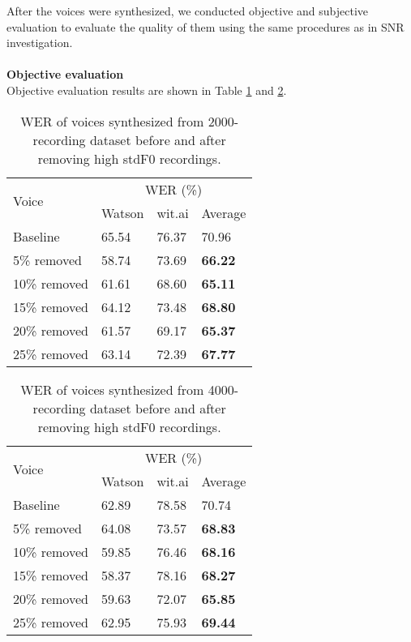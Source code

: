 \documentclass[12pt]{article}
\begin{document}
After the voices were synthesized, we conducted objective and subjective evaluation to evaluate the quality of them using the same procedures as in SNR investigation.\\\\
\textbf{Objective evaluation}
\vspace{0.28cm}\\
Objective evaluation results are shown in Table \ref{tab_werStdF02000} and \ref{tab_werStdF04000}.
\begin{table}[]
\begin{center}
\caption{WER of voices synthesized from 2000-recording dataset before and after removing high stdF0 recordings.}
\label{tab_werStdF02000}
\vspace{3mm}
\begin{tabular}{|l|l|l|l|}
\hline
\multirow{2}{2.5cm}{Voice} &
\multicolumn{3}{c|}{WER (\%)} \\ \cline{2-4}
& Watson & wit.ai & Average \\
\hline
Baseline     & 65.54 & 76.37 & 70.96 \\
5\% removed  & 58.74 & 73.69 & \textbf{66.22} \\
10\% removed & 61.61 & 68.60 & \textbf{65.11} \\
15\% removed & 64.12 & 73.48 & \textbf{68.80} \\
20\% removed & 61.57 & 69.17 & \textbf{65.37} \\
25\% removed & 63.14 & 72.39 & \textbf{67.77} \\
\hline
\end{tabular}
\end{center}
\end{table}
\begin{table}[]
\begin{center}
\caption{WER of voices synthesized from 4000-recording dataset before and after removing high stdF0 recordings.}
\label{tab_werStdF04000}
\vspace{3mm}
\begin{tabular}{|l|l|l|l|}
\hline
\multirow{2}{2.5cm}{Voice} &
\multicolumn{3}{c|}{WER (\%)} \\ \cline{2-4}
& Watson & wit.ai & Average \\
\hline
Baseline     & 62.89 & 78.58 & 70.74 \\
5\% removed  & 64.08 & 73.57 & \textbf{68.83} \\
10\% removed & 59.85 & 76.46 & \textbf{68.16} \\
15\% removed & 58.37 & 78.16 & \textbf{68.27} \\
20\% removed & 59.63 & 72.07 & \textbf{65.85} \\
25\% removed & 62.95 & 75.93 & \textbf{69.44} \\
\hline
\end{tabular}
\end{center}
\end{table}
\end{document}
